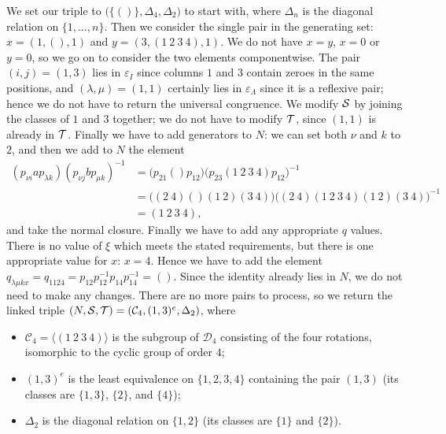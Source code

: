 \begin{example}
  We set our triple to $\big(\{()\}, \Delta_4, \Delta_2\big)$ to start with, where
  $\Delta_n$ is the diagonal relation on $\{1, \ldots, n\}$.  Then we consider
  the single pair in the generating set: $x = \left(1, (), 1\right)$ and
  $y = \left(3, (1~2~3~4), 1\right)$.  We do not have $x=y$, $x=0$ or $y=0$, so
  we go on to consider the two elements componentwise.  The pair $(i,j) = (1,3)$
  lies in $\varepsilon_I$ since columns $1$ and $3$ contain zeroes in the same
  positions, and $(\lambda,\mu) = (1,1)$ certainly lies in $\varepsilon_\Lambda$
  since it is a reflexive pair; hence we do not have to return the universal
  congruence.  We modify $\mathcal{S}$ by joining the classes of $1$ and $3$ together;
  we do not have to modify $\mathcal{T}$, since $(1,1)$ is already in $\mathcal{T}$.  Finally we
  have to add generators to $N$: we can set both $\nu$ and $k$ to $2$, and then
  we add to $N$ the element
  \begin{align*}
    (p_{\nu i}ap_{\lambda k})(p_{\nu j}bp_{\mu k})^{-1}
    &= \big(p_{2 1}()p_{1 2}\big)\big(p_{2 3}(1~2~3~4)p_{1 2}\big)^{-1} \\
    &= \big((2~4)()(1~2)(3~4)\big)\big((2~4)(1~2~3~4)(1~2)(3~4)\big)^{-1}\\
    &= (1~2~3~4),
  \end{align*}
  and take the normal closure.  Finally we have to add any appropriate $q$
  values.  There is no value of $\xi$ which meets the stated requirements, but
  there is one appropriate value for $x$: $x = 4$.  Hence we have to add the
  element
  $q_{\lambda \mu k x}
  = q_{1 1 2 4}
  = p_{1 2} p_{1 2}^{-1} p_{1 4} p_{1 4}^{-1}
  = ()$.
  Since the identity already lies in $N$, we do not need to make any changes.
  There are no more pairs to process, so we return the linked triple
  $(N,\mathcal{S},\mathcal{T}) = (\mathcal{C}_4, (1,3)^e, \Delta_2)$, where
  \begin{itemize}
  \item $\mathcal{C}_4 = \langle (1~2~3~4) \rangle$ is the subgroup of
    $\mathcal{D}_4$ consisting of the four rotations, isomorphic to the cyclic
    group of order $4$;
  \item $(1,3)^e$ is the least equivalence on $\{1,2,3,4\}$ containing the pair
    $(1,3)$ (its classes are $\{1,3\}$, $\{2\}$, and $\{4\}$);
  \item $\Delta_2$ is the diagonal relation on $\{1,2\}$ (its classes are
    $\{1\}$ and $\{2\}$).
  \end{itemize}
\end{example}


